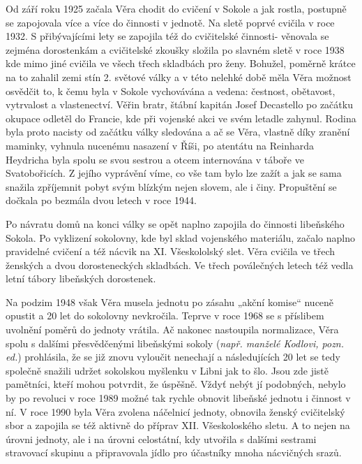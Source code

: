 Od září roku 1925 začala Věra chodit do cvičení v Sokole a jak rostla,
postupně se zapojovala více a více do činnosti v jednotě. Na sletě
poprvé cvičila v roce 1932. S přibývajícími lety se zapojila též do
cvičitelské činnosti- věnovala se zejména dorostenkám a cvičitelské
zkoušky složila po slavném sletě v roce 1938 kde mimo jiné cvičila ve
všech třech skladbách pro ženy. Bohužel, poměrně krátce na to zahalil
zemi stín 2. světové války a v této nelehké době měla Věra možnost
osvědčit to, k čemu byla v Sokole vychovávána a vedena: čestnost,
obětavost, vytrvalost a vlastenectví. Věřin bratr, štábní kapitán Josef
Decastello po začátku okupace odletěl do Francie, kde při vojenské akci
ve svém letadle zahynul. Rodina byla proto nacisty od začátku války
sledována a ač se Věra, vlastně díky zranění maminky, vyhnula nucenému
nasazení v Říši, po atentátu na Reinharda Heydricha byla spolu se svou
sestrou a otcem internována v táboře ve Svatobořicích. Z jejího
vyprávění víme, co vše tam bylo lze zažít a jak se sama snažila
zpříjemnit pobyt svým blízkým nejen slovem, ale i činy. Propuštění se
dočkala po bezmála dvou letech v roce 1944.

Po návratu domů na konci války se opět naplno zapojila do činnosti
libeňského Sokola. Po vyklizení sokolovny, kde byl sklad vojenského
materiálu, začalo naplno pravidelné cvičení a též nácvik na XI.
Všeskololský slet. Věra cvičila ve třech ženských a dvou dorosteneckých
skladbách. Ve třech poválečných letech též vedla letní tábory libeňských
dorostenek.

Na podzim 1948 však Věra musela jednotu po zásahu „akční komise`` nuceně
opustit a 20 let do sokolovny nevkročila. Teprve v roce 1968 se s
příslibem uvolnění poměrů do jednoty vrátila. Ač nakonec nastoupila
normalizace, Věra spolu s dalšími přesvědčenými libeňskými sokoly
(\emph{např. manželé Kodlovi, pozn. ed.}) prohlásila, že se již znovu
vyloučit nenechají a následujících 20 let se tedy společně snažili
udržet sokolskou myšlenku v Libni jak to šlo. Jsou zde jistě pamětníci,
kteří mohou potvrdit, že úspěšně. Vždyť nebýt jí podobných, nebylo by po
revoluci v roce 1989 možné tak rychle obnovit libeňské jednotu i činnost
v ní. V roce 1990 byla Věra zvolena náčelnicí jednoty, obnovila ženský
cvičitelský sbor a zapojila se též aktivně do příprav XII. Všeskoloského
sletu. A to nejen na úrovni jednoty, ale i na úrovni celostátní, kdy
utvořila s dalšími sestrami stravovací skupinu a připravovala jídlo pro
účastníky mnoha nácvičných srazů.

